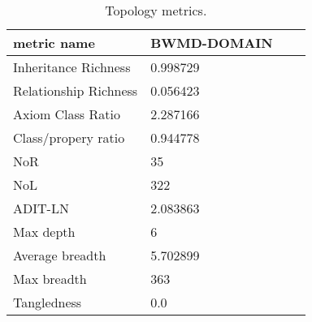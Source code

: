 \begin{table}
\centering
\caption{Topology metrics.}
\label{tab:topology-metrics}
\begin{tabular}{p{2.5cm}|p{1cm}p{1cm}p{1cm}}
\toprule
           metric name & BWMD-DOMAIN \\
\midrule
  Inheritance Richness &    0.998729 \\
 Relationship Richness &    0.056423 \\
     Axiom Class Ratio &    2.287166 \\
   Class/propery ratio &    0.944778 \\
                   NoR &          35 \\
                   NoL &         322 \\
               ADIT-LN &    2.083863 \\
             Max depth &           6 \\
       Average breadth &    5.702899 \\
           Max breadth &         363 \\
           Tangledness &         0.0 \\
\bottomrule
\end{tabular}
\end{table}
